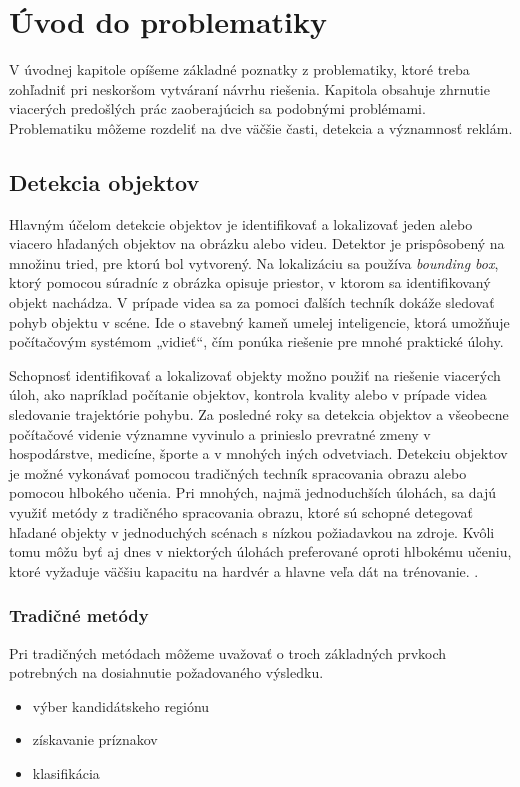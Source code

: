 \chapter{Úvod do problematiky}\label{chap:overview}

V úvodnej kapitole opíšeme základné poznatky z problematiky, ktoré treba zohľadniť pri neskoršom vytváraní návrhu riešenia. Kapitola obsahuje zhrnutie viacerých predošlých prác zaoberajúcich sa podobnými problémami. Problematiku môžeme rozdeliť na dve väčšie časti, detekcia a významnosť reklám.

\section{Detekcia objektov}

Hlavným účelom detekcie objektov je identifikovať a lokalizovať jeden alebo viacero hľadaných objektov na obrázku alebo videu. Detektor je prispôsobený na množinu tried, pre ktorú bol vytvorený. Na lokalizáciu sa používa \textit{bounding box}, ktorý pomocou súradníc z obrázka opisuje priestor, v ktorom sa identifikovaný objekt nachádza. V prípade videa sa za pomoci ďalších techník dokáže sledovať pohyb objektu v scéne. Ide o stavebný kameň umelej inteligencie, ktorá umožňuje počítačovým systémom „vidieť“, čím ponúka riešenie pre mnohé praktické úlohy.

Schopnosť identifikovať a lokalizovať objekty možno použiť na riešenie viacerých úloh, ako napríklad počítanie objektov, kontrola kvality alebo v prípade videa sledovanie trajektórie pohybu. Za posledné roky sa detekcia objektov a všeobecne počítačové videnie významne vyvinulo a prinieslo prevratné zmeny v hospodárstve, medicíne, športe a v mnohých iných odvetviach. Detekciu objektov je možné vykonávať pomocou tradičných techník spracovania obrazu alebo pomocou hlbokého učenia. Pri mnohých, najmä jednoduchších úlohách, sa dajú využiť metódy z tradičného spracovania obrazu, ktoré sú schopné detegovať hľadané objekty v jednoduchých scénach s nízkou požiadavkou na zdroje. Kvôli tomu môžu byť aj dnes v niektorých úlohách preferované oproti hlbokému učeniu, ktoré vyžaduje väčšiu kapacitu na hardvér a hlavne veľa dát na trénovanie. \cite{CV-vs-DL}.

\subsection{Tradičné metódy}

Pri tradičných metódach môžeme uvažovať o troch základných prvkoch potrebných na dosiahnutie požadovaného výsledku.
\begin{itemize}
    \item výber kandidátskeho regiónu
    \item získavanie príznakov
    \item klasifikácia
\end{itemize}

